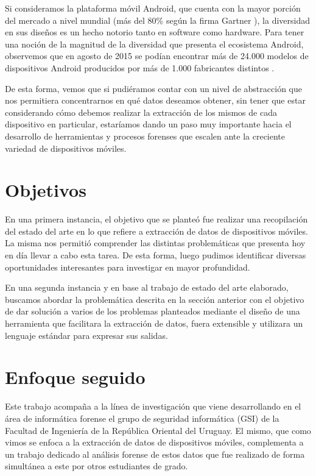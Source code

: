 Si consideramos la plataforma móvil Android, que cuenta con la mayor porción del mercado a nivel mundial (más del 80\% según la firma Gartner \cite{gartnerSales}), la diversidad en sus diseños es un hecho notorio tanto en software como hardware. Para tener una noción de la magnitud de la diversidad que presenta el ecosistema Android, observemos que en agosto de 2015 se podían encontrar más de 24.000 modelos de dispositivos Android producidos por más de 1.000 fabricantes distintos \cite{androidFragment}.

De esta forma, vemos que si pudiéramos contar con un nivel de abstracción que nos permitiera concentrarnos en qué datos deseamos obtener, sin tener que estar considerando cómo debemos realizar la extracción de los mismos de cada dispositivo en particular, estaríamos dando un paso muy importante hacia el desarrollo de herramientas y procesos forenses que escalen ante la creciente variedad de dispositivos móviles.

\section{Objetivos}
En una primera instancia, el objetivo que se planteó fue realizar una recopilación del estado del arte en lo que refiere a extracción de datos de dispositivos móviles. La misma nos permitió comprender las distintas problemáticas que presenta hoy en día llevar a cabo esta tarea. De esta forma, luego pudimos identificar diversas oportunidades interesantes para investigar en mayor profundidad.

En una segunda instancia y en base al trabajo de estado del arte elaborado, buscamos abordar la problemática descrita en la sección anterior con el objetivo de dar solución a varios de los problemas planteados mediante el diseño de una herramienta que facilitara la extracción de datos, fuera extensible y utilizara un lenguaje estándar para expresar sus salidas.

\section{Enfoque seguido}
Este trabajo acompaña a la línea de investigación que viene desarrollando en el área de informática forense el grupo de seguridad informática (GSI) de la Facultad de Ingeniería de la República Oriental del Uruguay. El mismo, que como vimos se enfoca a la extracción de datos de dispositivos móviles, complementa a un trabajo dedicado al análisis forense de estos datos que fue realizado de forma simultánea a este por otros estudiantes de grado.

